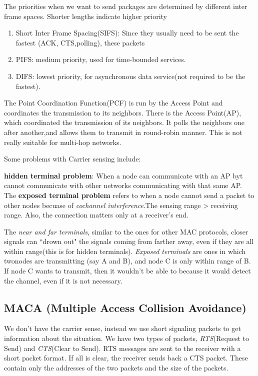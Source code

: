 \documentclass{article}
\begin{document}
The priorities when we want to send packages are determined by different inter frame spaces. Shorter lengths 
indicate higher priority
\begin{enumerate}
	\item{Short Inter Frame Spacing(SIFS)}:  Since they usually need to be sent the fastest (ACK, CTS,polling), these
	packets 
	\item{PIFS}: medium priority, used for time-bounded services.
	\item{DIFS}: lowest priority, for asynchronous data service(not required to be the fastest).
\end{enumerate}
The Point Coordination Function(PCF) is run by the Access Point and coordinates the transmission to its neighbors. There is
the Access Point(AP), which coordinated the transmission of its neighbors. It polls the neighbors one after another,and 
allows them to transmit in round-robin manner. This is not really suitable for multi-hop networks.

Some problems with Carrier sensing include:

\textbf{hidden terminal problem}: When a node can communicate with an AP byt cannot communicate with other networks
communicating with that same AP. The \textbf{exposed terminal problem} refers to when a node cannot send a packet 
to other nodes becuase of \textit{cochannel interference}.The sensing range > receiving range. Also, the 
connection matters only at a receiver's end.

The \textit{near and far terminals}, similar to the ones for other MAC protocols, closer signals can ``drown out" the
signals coming from farther away, even if they are all within range(this is for hidden terminals). 
\textit{Exposed terminals} are ones in which twonodes are transmitting (say A and B), and node C is 
only within range of B. If node C wants to transmit, then it wouldn't
be able to because it would detect the channel, even if it is not necessary. 



\subsection{MACA (Multiple Access Collision Avoidance)}
We don't have the carrier sense, instead we use short signaling packets to get information about the situation. We have 
two types of packets, \textit{RTS}(Request to Send) and \textit{CTS}(Clear to Send). RTS messages are sent to the receiver
with a short packet format. If all is clear, the receiver sends back a CTS packet. These contain only the addresses of the 
two packets and the size of the packets.
\end{document}
